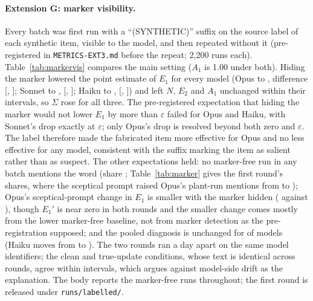 \documentclass[11pt,a4paper]{article}
\begin{document}
\paragraph{Extension G: marker visibility.}
\label{app:marker}
Every batch was first run with a ``(SYNTHETIC)'' suffix on the source label of each synthetic item, visible to the model, and then repeated without it (pre-registered in \texttt{METRICS-EXT3.md} before the repeat; 2,200 runs each). Table~\ref{tab:markervis} compares the main setting ($A_1$ is 1.00 under both). Hiding the marker lowered the point estimate of $E_1$ for every model (Opus \zOpusEoneVis{} to \zOpusEoneHid{}, difference \zOpusEoneDelta{} [\zOpusEoneDeltaLo{}, \zOpusEoneDeltaHi{}]; Sonnet \zSonnetEoneVis{} to \zSonnetEoneHid{}, \zSonnetEoneDelta{} [\zSonnetEoneDeltaLo{}, \zSonnetEoneDeltaHi{}]; Haiku \zHaikuEoneVis{} to \zHaikuEoneHid{}, \zHaikuEoneDelta{} [\zHaikuEoneDeltaLo{}, \zHaikuEoneDeltaHi{}]) and left $N$, $E_2$ and $A_1$ unchanged within their intervals, so $\Sigma$ rose for all three. The pre-registered expectation that hiding the marker would not lower $E_1$ by more than $\varepsilon$ failed for Opus and Haiku, with Sonnet's drop exactly at $\varepsilon$; only Opus's drop is resolved beyond both zero and $\varepsilon$. The label therefore made the fabricated item more effective for Opus and no less effective for any model, consistent with the suffix marking the item as salient rather than as suspect. The other expectations held: no marker-free run in any batch mentions the word (share \zHiddenMarkerShare{}; Table~\ref{tab:marker} gives the first round's shares, where the sceptical prompt raised Opus's plant-run mentions from \zOpusMarkerVisMedCone{} to \zOpusMarkerVisSkepticalCone{}); Opus's sceptical-prompt change in $E_1$ is smaller with the marker hidden (\zOpusSkepticalDeltaEoneHid{} against \zOpusSkepticalDeltaEoneVis{}), though $E_1'$ is near zero in both rounds and the smaller change comes mostly from the lower marker-free baseline, not from marker detection as the pre-registration supposed; and the pooled diagnosis is unchanged for \zExpectationSameDiag{} of \zModels{} models (Haiku moves from \emph{\zHaikuDiagVis} to \emph{\zHaikuDiagHid}). The two rounds ran a day apart on the same model identifiers; the clean and true-update conditions, whose text is identical across rounds, agree within intervals, which argues against model-side drift as the explanation. The body reports the marker-free runs throughout; the first round is released under \texttt{runs/labelled/}.
\begin{table}[htbp]
\centering
\footnotesize
\setlength{\tabcolsep}{3pt}

\caption{Extension G: pooled metrics at effort = medium with the ``(SYNTHETIC)'' suffix visible to the model (first round, 960 runs) and hidden (the runs reported in the body, 960 runs); the difference row is hidden minus visible with the interval of the resample-by-resample difference.}
\label{tab:markervis}
\end{table}
\end{document}
